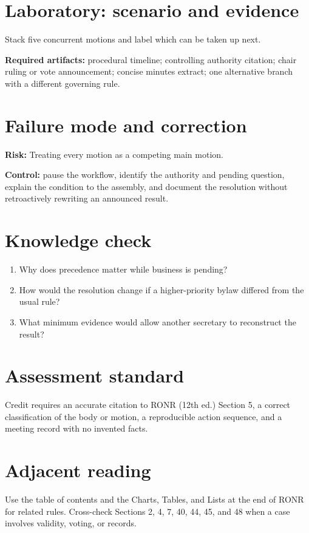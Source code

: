 \documentclass[11pt]{article}
\begin{document}
\section{Laboratory: scenario and evidence}
Stack five concurrent motions and label which can be taken up next.

\textbf{Required artifacts:} procedural timeline; controlling authority citation; chair ruling or vote announcement; concise minutes extract; one alternative branch with a different governing rule.

\section{Failure mode and correction}
\textbf{Risk:} Treating every motion as a competing main motion.

\textbf{Control:} pause the workflow, identify the authority and pending question, explain the condition to the assembly, and document the resolution without retroactively rewriting an announced result.

\section{Knowledge check}
\begin{enumerate}[leftmargin=*,itemsep=4pt]
\item Why does precedence matter while business is pending?
\item How would the resolution change if a higher-priority bylaw differed from the usual rule?
\item What minimum evidence would allow another secretary to reconstruct the result?
\end{enumerate}

\section{Assessment standard}
Credit requires an accurate citation to RONR (12th ed.) Section 5, a correct classification of the body or motion, a reproducible action sequence, and a meeting record with no invented facts.

\section{Adjacent reading}
Use the table of contents and the Charts, Tables, and Lists at the end of RONR for related rules. Cross-check Sections 2, 4, 7, 40, 44, 45, and 48 when a case involves validity, voting, or records.
\end{document}
